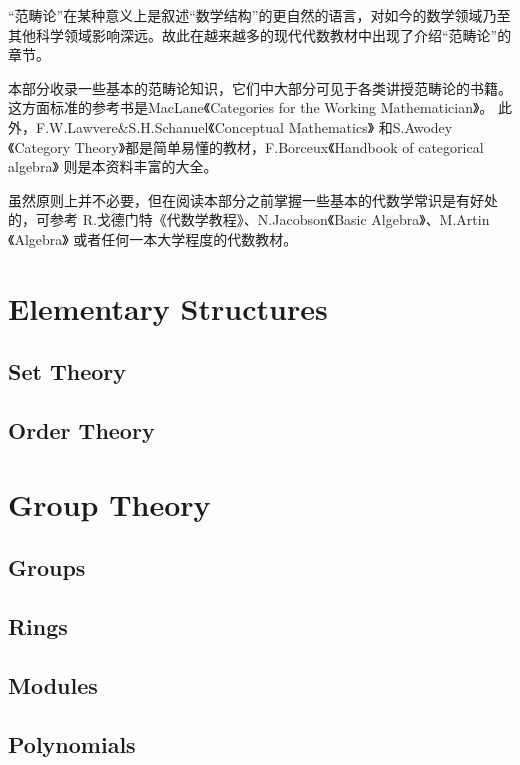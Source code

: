  “范畴论”在某种意义上是叙述“数学结构”的更自然的语言，对如今的数学领域乃至其他科学领域影响深远。故此在越来越多的现代代数教材中出现了介绍“范畴论”的章节。

  本部分收录一些基本的范畴论知识，它们中大部分可见于各类讲授范畴论的书籍。这方面标准的参考书是MacLane《Categories for the Working Mathematician》\cite{lane1998categories}。 此外，F.W.Lawvere\&S.H.Schanuel《Conceptual Mathematics》\cite{lawvere1997conceptual} 和S.Awodey《Category Theory》\cite{awodey2010category}都是简单易懂的教材，F.Borceux《Handbook of categorical algebra》\cite{borceux} 则是本资料丰富的大全。

  虽然原则上并不必要，但在阅读本部分之前掌握一些基本的代数学常识是有好处的，可参考
  R.戈德门特《代数学教程》\cite{godement1963cours}、N.Jacobson《Basic Algebra》\cite{jacobson1980basic}、M.Artin《Algebra》\cite{artin2011algebra} 或者任何一本大学程度的代数教材。

  
  

\part{Elementary Structures}
\chapter{Set Theory}
\chapter{Order Theory}

\part{Group Theory}
\chapter{Groups}

\chapter{Rings}

\chapter{Modules}

\chapter{Polynomials}
